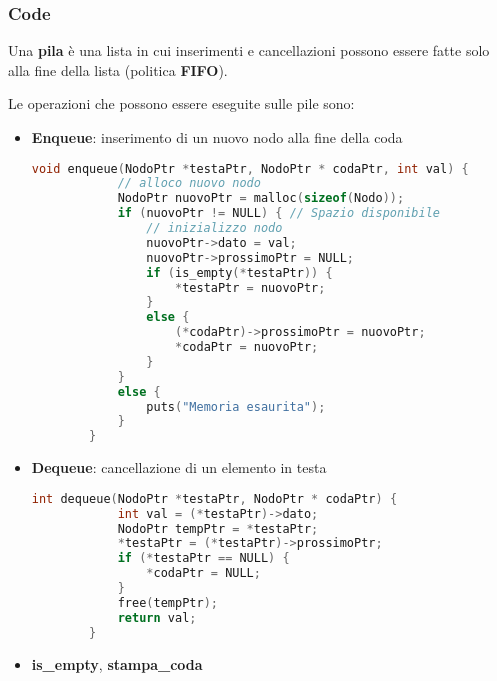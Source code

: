 \subsubsection{Code}
\begin{definition}
	Una \textbf{pila} è una lista in cui inserimenti e cancellazioni possono essere fatte solo alla fine della lista (politica \textbf{FIFO}).
\end{definition}
Le operazioni che possono essere eseguite sulle pile sono:
\begin{itemize}
	\item \textbf{Enqueue}: inserimento di un nuovo nodo alla fine della coda
	\begin{lstlisting}[language=C]
		void enqueue(NodoPtr *testaPtr, NodoPtr * codaPtr, int val) {
			// alloco nuovo nodo
			NodoPtr nuovoPtr = malloc(sizeof(Nodo));
			if (nuovoPtr != NULL) { // Spazio disponibile
				// inizializzo nodo
				nuovoPtr->dato = val;
				nuovoPtr->prossimoPtr = NULL;
				if (is_empty(*testaPtr)) {
					*testaPtr = nuovoPtr;
				}
				else {
					(*codaPtr)->prossimoPtr = nuovoPtr;
					*codaPtr = nuovoPtr;
				}
			}
			else {
				puts("Memoria esaurita");
			}
		}
	\end{lstlisting}
	\item  \textbf{Dequeue}: cancellazione di un elemento in testa
	\begin{lstlisting}[language=C]
		int dequeue(NodoPtr *testaPtr, NodoPtr * codaPtr) {
			int val = (*testaPtr)->dato;
			NodoPtr tempPtr = *testaPtr;
			*testaPtr = (*testaPtr)->prossimoPtr;	
			if (*testaPtr == NULL) {
				*codaPtr = NULL;
			}
			free(tempPtr);
			return val;
		}
	\end{lstlisting}
	\item \textbf{is\_empty}, \textbf{stampa\_coda}
\end{itemize}
